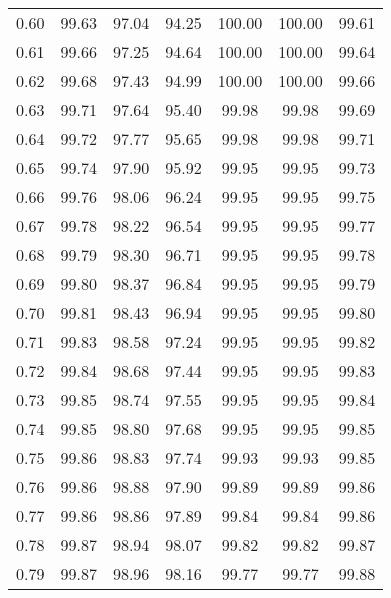 \begin{tabular}{|c|c|c|c|c|c|c|}
      0.60 &     99.63 &     97.04 &      94.25 &  100.00 &     100.00 &         99.61 \\
      0.61 &     99.66 &     97.25 &      94.64 &  100.00 &     100.00 &         99.64 \\
      0.62 &     99.68 &     97.43 &      94.99 &  100.00 &     100.00 &         99.66 \\
      0.63 &     99.71 &     97.64 &      95.40 &   99.98 &      99.98 &         99.69 \\
      0.64 &     99.72 &     97.77 &      95.65 &   99.98 &      99.98 &         99.71 \\
      0.65 &     99.74 &     97.90 &      95.92 &   99.95 &      99.95 &         99.73 \\
      0.66 &     99.76 &     98.06 &      96.24 &   99.95 &      99.95 &         99.75 \\
      0.67 &     99.78 &     98.22 &      96.54 &   99.95 &      99.95 &         99.77 \\
      0.68 &     99.79 &     98.30 &      96.71 &   99.95 &      99.95 &         99.78 \\
      0.69 &     99.80 &     98.37 &      96.84 &   99.95 &      99.95 &         99.79 \\
      0.70 &     99.81 &     98.43 &      96.94 &   99.95 &      99.95 &         99.80 \\
      0.71 &     99.83 &     98.58 &      97.24 &   99.95 &      99.95 &         99.82 \\
      0.72 &     99.84 &     98.68 &      97.44 &   99.95 &      99.95 &         99.83 \\
      0.73 &     99.85 &     98.74 &      97.55 &   99.95 &      99.95 &         99.84 \\
      0.74 &     99.85 &     98.80 &      97.68 &   99.95 &      99.95 &         99.85 \\
      0.75 &     99.86 &     98.83 &      97.74 &   99.93 &      99.93 &         99.85 \\
      0.76 &     99.86 &     98.88 &      97.90 &   99.89 &      99.89 &         99.86 \\
      0.77 &     99.86 &     98.86 &      97.89 &   99.84 &      99.84 &         99.86 \\
      0.78 &     99.87 &     98.94 &      98.07 &   99.82 &      99.82 &         99.87 \\
      0.79 &     99.87 &     98.96 &      98.16 &   99.77 &      99.77 &         99.88 \\

\end{tabular}
